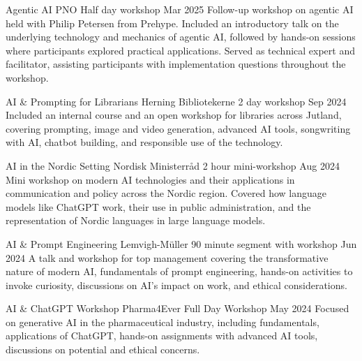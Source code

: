 

\begin{cventries}

\cventry
{Agentic AI} %
{PNO} %
{Half day workshop} %
{Mar 2025} %
{
  Follow-up workshop on agentic AI held with Philip Petersen from Prehype. Included an introductory talk on the underlying technology and mechanics of agentic AI, followed by hands-on sessions where participants explored practical applications. Served as technical expert and facilitator, assisting participants with implementation questions throughout the workshop.
}

\cventry
{AI \& Prompting for Librarians} %
{Herning Bibliotekerne} %
{2 day workshop} %
{Sep 2024} %
{
  Included an internal course and an open workshop for libraries across Jutland, covering prompting, image and video generation, advanced AI tools, songwriting with AI, chatbot building, and responsible use of the technology.
}

\cventry
{AI in the Nordic Setting} %
{Nordisk Ministerråd} %
{2 hour mini-workshop} %
{Aug 2024} %
{
   Mini workshop on modern AI technologies and their applications in communication and policy across the Nordic region. Covered how language models like ChatGPT work, their use in public administration, and the representation of Nordic languages in large language models.
}

\cventry
{AI \& Prompt Engineering} %
{Lemvigh-Müller} %
{90 minute segment with workshop} %
{Jun 2024} %
{
  A talk and workshop for top management covering the transformative nature of modern AI, fundamentals of prompt engineering, hands-on activities to invoke curiosity, discussions on AI's impact on work, and ethical considerations.
}

\cventry
{AI \& ChatGPT Workshop} %
{Pharma4Ever} %
{Full Day Workshop} %
{May 2024} %
{
  Focused on generative AI in the pharmaceutical industry, including fundamentals, applications of ChatGPT, hands-on assignments with advanced AI tools, discussions on potential and ethical concerns.
}


\end{cventries}

